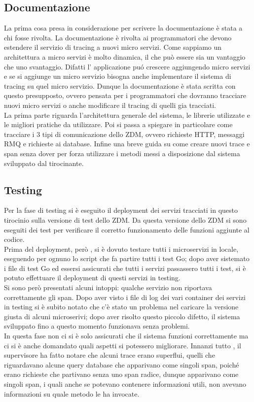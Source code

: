 \documentclass[a4paper,12pt,titlepage,italian,openany]{report}
\begin{document}
 \subsection{Documentazione}
 La prima cosa presa in considerazione per scrivere la documentazione è stata  a chi fosse rivolta. La documentazione è rivolta ai programmatori che devono estendere il servizio di tracing a nuovi micro servizi. Come sappiamo un architettura a micro servizi è molto dinamica, il che può essere sia un vantaggio che uno svantaggio. Difatti l' applicazione puó crescere aggiungendo micro servizi e se si aggiunge un micro servizio bisogna anche implementare il sistema di tracing su quel micro servizio.
 Dunque la documentazione è stata scritta con questo presupposto, ovvero pensata per i programmatori che dovranno tracciare nuovi micro servizi o anche modificare il tracing di quelli gia tracciati.\\
 La prima parte riguarda l'architettura generale del sistema, le librerie utilizzate e le migliori pratiche da utilizzare. Poi si passa a spiegare in particolare come tracciare i 3 tipi di comunicazione dello ZDM\cite{zdm:1}, ovvero richieste HTTP, messaggi RMQ\cite{rabbit:1} e richieste ai database. 
 Infine una breve guida su come creare nuovi trace e span senza dover per forza utilizzare i metodi messi a disposizione dal sistema sviluppato dal tirocinante. 


\subsection{Testing}
Per la fase di testing si è eseguito il deployment dei servizi tracciati in questo tirocinio sulla versione di test dello ZDM\cite{zdm:1}.
 Da questa versione dello ZDM\cite{zdm:1} si sono eseguiti dei test per verificare il corretto funzionamento delle funzioni aggiunte al codice.\\
Prima del deployment, però , si è dovuto testare tutti i microservizi in locale, eseguendo per ognuno lo script che fa partire tutti i test Go;
 dopo aver sistemato i file di test Go ed essersi assicurati che tutti i servizi passassero tutti i test, si è potuto effettuare il deployment di questi servizi in testing.\\ 
Si sono però presentati alcuni intoppi: qualche servizio non riportava correttamente gli span. 
Dopo aver visto i file di log dei vari container dei servizi in testing si è subito notato che c'è stato un problema nel caricare la versione giusta di alcuni microserivi; dopo aver risolto questo piccolo difetto, il sistema sviluppato fino a questo momento funzionava senza problemi.
\\In questa fase non ci si è solo assicurati che il sistema funzioni correttamente ma ci si è anche domandato quali aspetti si potessero migliorare. Innanzi tutto , il supervisore ha fatto notare che alcuni trace erano superflui, quelli che riguardavano alcune query database che apparivano come singoli span, poiché erano richieste che partivano senza uno span radice, dunque apparivano come singoli span, i quali anche 
se potevano contenere informazioni utili, non avevano informazioni su quale metodo le ha invocate.
\cite{opentracing:1}
\end{document}

